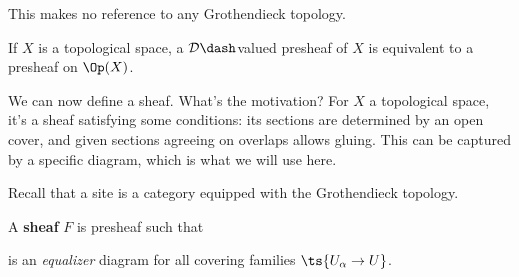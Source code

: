 \begin{remark}

This makes no reference to any Grothendieck topology.

\end{remark}

\begin{example}[?]

If \(X\) is a topological space, a \(\mathcal{D}\dash\)valued presheaf
of \(X\) is equivalent to a presheaf on \(\Op(X)\).

\end{example}

We can now define a sheaf. What's the motivation? For \(X\) a
topological space, it's a sheaf satisfying some conditions: its sections
are determined by an open cover, and given sections agreeing on overlaps
allows gluing. This can be captured by a specific diagram, which is what
we will use here.

Recall that a site is a category equipped with the Grothendieck
topology.

\begin{definition}[Sheaf]

A \textbf{sheaf} \(F\) is presheaf such that

\begin{center}
\end{center}

is an \emph{equalizer} diagram for all covering families
\(\ts{U_\alpha \to U}\).

\end{definition}

